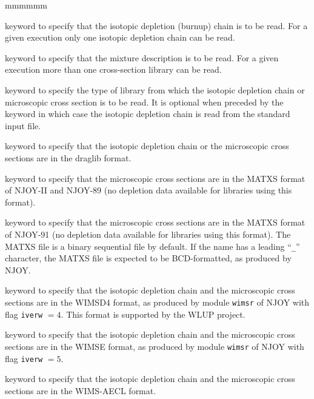 \begin{ListeDeDescription}{mmmmmm}
\item[\moc{DEPL}] keyword to specify that the isotopic depletion (burnup)
chain is to be read. For a given  execution only one isotopic
depletion chain can be read. 

\item[\moc{MIXS}] keyword to specify that the mixture description is to be
read. For a given  execution more than one cross-section library can
be read. 

\item[\moc{LIB:}] keyword to specify the type of library from which the
isotopic depletion chain or microscopic cross section is to be read. It is
optional when preceded by the keyword  in which case the isotopic
depletion chain is read from the standard input file. 

\item[\moc{DRAGON}] keyword to specify that the isotopic depletion chain or
the microscopic cross sections are in the {\sc draglib} format.

\item[\moc{MATXS}] keyword to specify that the microscopic cross sections are
in the MATXS format of NJOY-II and NJOY-89 (no depletion data available for
libraries using this format).

\item[\moc{MATXS2}] keyword to specify that the microscopic cross sections are
in the MATXS format of NJOY-91 (no depletion data available for libraries using
this format). The MATXS file is a binary sequential file by default. If the name
 has a leading ``{\tt \_}'' character, the MATXS file is expected to be
BCD-formatted, as produced by NJOY.

\item[\moc{WIMSD4}] keyword to specify that the isotopic depletion chain and the
microscopic cross sections are in the WIMSD4 format, as produced by module {\tt wimsr} of NJOY with flag
{\tt iverw} $=4$. This format is supported by the WLUP project.\cite{wlup}

\item[\moc{WIMSE}] keyword to specify that the isotopic depletion chain and the
microscopic cross sections are in the WIMSE format, as produced by module {\tt wimsr} of NJOY with flag
{\tt iverw} $=5$.

\item[\moc{WIMSAECL}] keyword to specify that the isotopic depletion chain and the
microscopic cross sections are in the WIMS-AECL format.


\end{ListeDeDescription}

